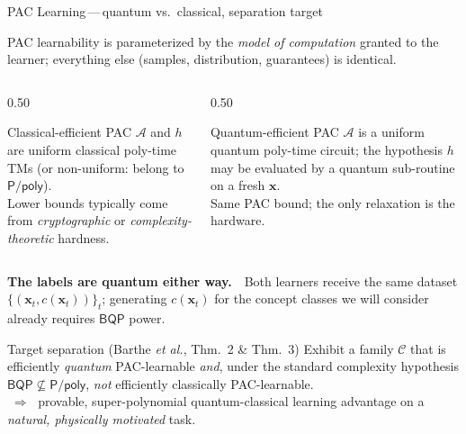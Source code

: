 \documentclass[aspectratio=169,11pt,xcolor={dvipsnames,table}]{beamer}
\newcommand{\BQP}{\mathsf{BQP}}
\newcommand{\Ppoly}{\mathsf{P/poly}}
\newcommand{\Algo}{\mathcal{A}}
\newcommand{\Cclass}{\mathcal{C}}
\renewcommand{\vec}[1]{\bm{#1}}
\newcommand{\xvec}{\vec x}
\theoremstyle{definition}
\begin{document}
\begin{frame}{PAC Learning\,---\,quantum vs.\ classical, separation target}

  \footnotesize
  PAC learnability is parameterized by the \emph{model of computation}
  granted to the learner; everything else (samples, distribution,
  guarantees) is identical.

  \begin{columns}[T,onlytextwidth]
    \begin{column}{0.50\textwidth}
      \begin{block}{\small Classical-efficient PAC}
        \scriptsize
        \(\Algo\) and \(h\) are uniform classical poly-time TMs
        (or non-uniform: belong to \(\Ppoly\)).\\[0.2em]
        Lower bounds typically come from \emph{cryptographic} or
        \emph{complexity-theoretic} hardness.
      \end{block}
    \end{column}
    \begin{column}{0.50\textwidth}
      \begin{block}{\small Quantum-efficient PAC}
        \scriptsize
        \(\Algo\) is a uniform quantum poly-time circuit; the hypothesis
        \(h\) may be evaluated by a quantum sub-routine on a fresh
        \(\xvec\).\\[0.2em]
        Same PAC bound; the only relaxation is the hardware.
      \end{block}
    \end{column}
  \end{columns}

  \vspace{0.1em}
  \footnotesize
  \textbf{The labels are quantum either way.}~~Both learners receive the
  same dataset \(\{(\xvec_t,c(\xvec_t))\}_t\); generating \(c(\xvec_t)\)
  for the concept classes we will consider already requires
  \(\BQP\) power.

  \begin{alertblock}{\small Target separation (Barthe \emph{et al.}, Thm.~2 \& Thm.~3)}
    \scriptsize
    Exhibit a family \(\Cclass\) that is
    \alert{efficiently \emph{quantum} PAC-learnable} \emph{and},
    under the standard complexity hypothesis
    \(\boxed{\BQP\not\subseteq\Ppoly}\),
    \alert{\emph{not} efficiently classically PAC-learnable}.
    \\[0.2em]
    \(\;\Rightarrow\;\) provable, super-polynomial quantum-classical
    learning advantage on a \emph{natural, physically motivated} task.
  \end{alertblock}


\end{frame}
\end{document}
